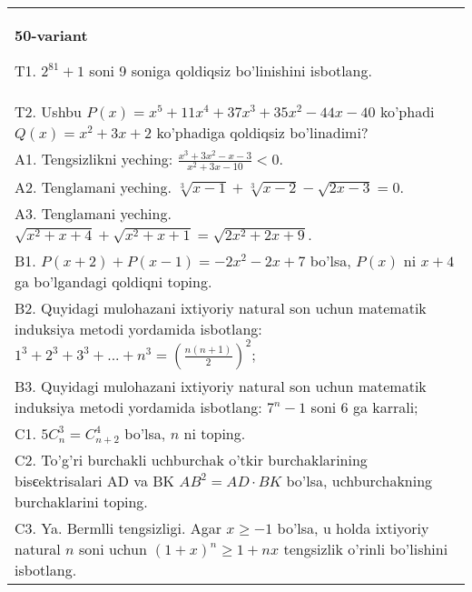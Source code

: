 \documentclass{article}
\begin{document}
\begin{tabular}{m{17cm}}
\textbf{50-variant}
\newline

T1. \(2^{81} + 1\) soni 9 soniga qoldiqsiz bo'linishini isbotlang. \\
T2. Ushbu \(P(x) = x^{5} + 11x^{4} + 37x^{3} + 35x^{2} - 44x - 40\) ko'phadi \(Q(x) = x^{2} + 3x + 2\) ko'phadiga qoldiqsiz bo'linadimi? \\
A1. Tengsizlikni yeching: \(\frac{x^{3} + 3x^{2} - x - 3}{x^{2} + 3x - 10} < 0\). \\
A2. Tenglamani yeching. \(\sqrt[3]{x - 1} + \sqrt[3]{x - 2} - \sqrt{2x - 3} = 0\). \\
A3. Tenglamani yeching. \(\sqrt{x^{2} + x + 4} + \sqrt{x^{2} + x + 1} = \sqrt{2x^{2} + 2x + 9}\). \\
B1. \(P(x + 2) + P(x - 1) = - 2x^{2} - 2x + 7\) bo'lsa, \(P(x)\) ni \(x + 4\) ga bo'lgandagi qoldiqni toping. \\
B2. Quyidagi mulohazani ixtiyoriy natural son uchun matematik induksiya metodi yordamida isbotlang: \(1^{3} + 2^{3} + 3^{3} + ... + n^{3} = \left( \frac{n(n + 1)}{2} \right)^{2}\); \\
B3. Quyidagi mulohazani ixtiyoriy natural son uchun matematik induksiya metodi yordamida isbotlang: \(7^{n} - 1\) soni 6 ga karrali; \\
C1. \(5C_{n}^{3} = C_{n + 2}^{4}\) bo'lsa, \(n\) ni toping. \\
C2. To'g'ri burchakli uchburchak o'tkir burchaklarining bisєektrisalari AD va BK \(AB^{2} = AD \cdot BK\) bo'lsa, uchburchakning burchaklarini toping. \\
C3. Ya. Bermlli tengsizligi. Agar \(x \geq - 1\) bo'lsa, u holda ixtiyoriy natural \(n\) soni uchun \((1 + x)^{n} \geq 1 + nx\) tengsizlik o'rinli bo'lishini isbotlang. \\

\end{tabular}
\vspace{1cm}
\end{document}

